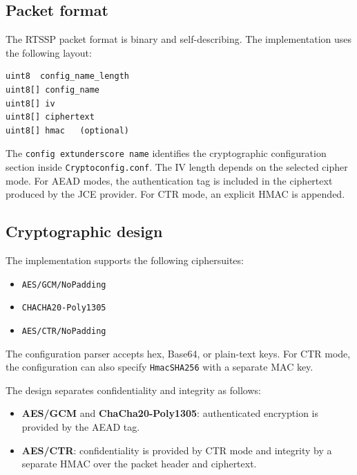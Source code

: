 \documentclass[11pt,a4paper]{article}
\begin{document}
\subsection{Packet format}
The RTSSP packet format is binary and self-describing. The implementation uses the following layout:
\begin{lstlisting}[language=plain]
uint8  config_name_length
uint8[] config_name
uint8[] iv
uint8[] ciphertext
uint8[] hmac   (optional)
\end{lstlisting}

The \texttt{config	extunderscore name} identifies the cryptographic configuration section inside \texttt{Cryptoconfig.conf}. The IV length depends on the selected cipher mode. For AEAD modes, the authentication tag is included in the ciphertext produced by the JCE provider. For CTR mode, an explicit HMAC is appended.

\subsection{Cryptographic design}
The implementation supports the following ciphersuites:
\begin{itemize}[leftmargin=1.2em]
  \item \texttt{AES/GCM/NoPadding}
  \item \texttt{CHACHA20-Poly1305}
  \item \texttt{AES/CTR/NoPadding}
\end{itemize}

The configuration parser accepts hex, Base64, or plain-text keys. For CTR mode, the configuration can also specify \texttt{HmacSHA256} with a separate MAC key.

The design separates confidentiality and integrity as follows:
\begin{itemize}[leftmargin=1.2em]
  \item \textbf{AES/GCM} and \textbf{ChaCha20-Poly1305}: authenticated encryption is provided by the AEAD tag.
  \item \textbf{AES/CTR}: confidentiality is provided by CTR mode and integrity by a separate HMAC over the packet header and ciphertext.
\end{itemize}
\end{document}

